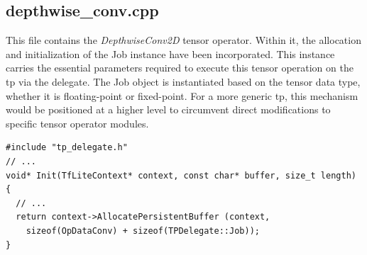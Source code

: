 \subsection*{depthwise\_conv.cpp}

This file contains the \textit{DepthwiseConv2D} tensor operator. Within it, the allocation and initialization of the Job instance have been incorporated. This instance carries the essential parameters required to execute this tensor operation on the \gls{tp} via the delegate. The Job object is instantiated based on the tensor data type, whether it is floating-point or fixed-point. For a more generic \gls{tp}, this mechanism would be positioned at a higher level to circumvent direct modifications to specific tensor operator modules.

\begin{lstlisting}
#include "tp_delegate.h"
// ...
void* Init(TfLiteContext* context, const char* buffer, size_t length)
{
  // ...
  return context->AllocatePersistentBuffer (context,
    sizeof(OpDataConv) + sizeof(TPDelegate::Job));
}
\end{lstlisting}

